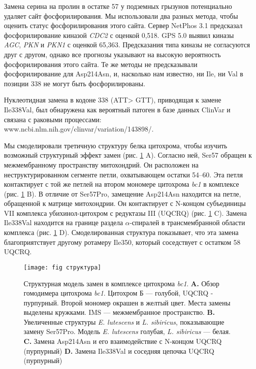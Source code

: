 Замена серина на пролин в остатке 57 у подземных грызунов потенциально удаляет сайт фосфорилирования. Мы использовали два разных метода, чтобы оценить статус фосфорилирования этого сайта. Сервер NetPhos 3.1 предсказал фосфорилирование киназой \textit{CDC2} с оценкой 0,518. GPS 5.0 выявил киназы \textit{AGC}, \textit{PKN} и \textit{PKN1} с оценкой 65,363. Предсказания типа киназы не согласуются друг с другом, однако все прогнозы указывают на высокую вероятность фосфорилирования этого сайта. Те же методы не предсказывали фосфорилирование для Asp214Asn, и, насколько нам известно, ни Ile, ни Val в позиции 338 не могут быть фосфорилированы.

Нуклеотидная замена в кодоне 338 (ATT> GTT), приводящая к замене Ile338Val, был обнаружена как вероятный патоген в базе данных ClinVar и связана с раковыми процессами: www.ncbi.nlm.nih.gov/clinvar/variation/143898/.

Мы смоделировали третичную структуру белка цитохрома, чтобы изучить возможный структурный эффект замен (рис. \ref{CytStructure} A). Согласно ней, Ser57 обращен к межмембранному пространству митохондрий. Он расположен на неструктурированном сегменте петли, охватывающем остатки 54–60. Эта петля контактирует с той же петлей на втором мономере цитохрома \textit{bc1} в комплексе (рис. \ref{CytStructure} B). В отличие от Ser57Pro, замещение Asp214Asn находится на петле, обращенной к матрице митохондрии. Он контактирует с N-концом субъединицы VII комплекса убихинол-цитохром с редуктазы III (UQCRQ) (рис. \ref{CytStructure} C). Замена Ile338Val находится на границе раздела $\alpha$-спиралей в трансмембранной области комплекса (рис. \ref{CytStructure} D). Смоделированная структура показывает, что эта замена благоприятствует другому ротамеру Ile350, который соседствует с остатком 58 UQCRQ.

\begin{figure}[h!]
		\begin{center}
		\texttt{[image: fig структура]}
	\end{center}
\caption{Структурная модель замен в комплексе цитохрома \textit{bc1}. \textbf{A.} Обзор гомодимера цитохрома \textit{bc1}. Цитохром Б --- голубой, UQCRQ - пурпурный. Второй мономер окрашен в желтый цвет. Места замены выделены кружками. IMS --- межмембранное пространство. \textbf{B.} Увеличенные структуры \textit{E. lutescens} и \textit{L. sibiricus}, показывающие замену Ser57Pro. Модель \textit{E. lutescens} голубая, \textit{L. sibiricus} --- белая. \textbf{C.} Замена Asp214Asn и его взаимодействие с N-концом UQCRQ (пурпурный) \textbf{D.} Замена Ile338Val и соседняя цепочка UQCRQ (пурпурный)}
\label{CytStructure}
\end{figure}

